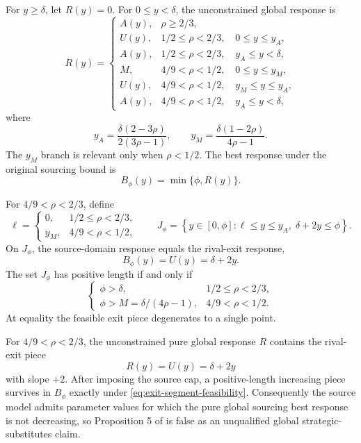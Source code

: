 For \(y\ge\delta\), let \(R(y)=0\).  For \(0\le y<\delta\), the unconstrained global response is
\begin{equation}
R(y)=
\begin{cases}
A(y),
& \rho\ge 2/3,\\[3pt]
U(y),
& 1/2\le\rho<2/3,\quad 0\le y\le y_A,\\
A(y),
& 1/2\le\rho<2/3,\quad y_A\le y<\delta,\\[3pt]
M,
& 4/9<\rho<1/2,\quad 0\le y\le y_M,\\
U(y),
& 4/9<\rho<1/2,\quad y_M\le y\le y_A,\\
A(y),
& 4/9<\rho<1/2,\quad y_A\le y<\delta,
\end{cases}
\label{eq:R}
\end{equation}
where
\begin{equation}
y_A=
\frac{\delta(2-3\rho)}{2(3\rho-1)},
\qquad
y_M=
\frac{\delta(1-2\rho)}{4\rho-1}.
\label{eq:yA-yM}
\end{equation}
The \(y_M\) branch is relevant only when \(\rho<1/2\).  The best response under the original sourcing bound is
\begin{equation}
B_\phi(y)=\min\{\phi,R(y)\}.
\label{eq:Bphi}
\end{equation}

For \(4/9<\rho<2/3\), define
\[
\ell=
\begin{cases}
0,&1/2\le\rho<2/3,\\
y_M,&4/9<\rho<1/2,
\end{cases}
\qquad
J_\phi=
\left\{
y\in[0,\phi]:
\ell\le y\le y_A,\;
\delta+2y\le\phi
\right\}.
\]
On \(J_\phi\), the source-domain response equals the rival-exit response,
\[
B_\phi(y)=U(y)=\delta+2y.
\]
The set \(J_\phi\) has positive length if and only if
\begin{equation}
\begin{cases}
\phi>\delta,&1/2\le\rho<2/3,\\[2pt]
\phi>M=\delta/(4\rho-1),&4/9<\rho<1/2.
\end{cases}
\label{eq:exit-segment-feasibility}
\end{equation}
At equality the feasible exit piece degenerates to a single point.

\begin{proposition}
\label{prop:prop5}
For \(4/9<\rho<2/3\), the unconstrained pure global response \(R\) contains the rival-exit piece
\[
R(y)=U(y)=\delta+2y
\]
with slope \(+2\).  After imposing the source cap, a positive-length increasing piece survives in \(B_\phi\) exactly under \eqref{eq:exit-segment-feasibility}.  Consequently the source model admits parameter values for which the pure global sourcing best response is not decreasing, so Proposition 5 of \cite{ShyStenbacka2005} is false as an unqualified global strategic-substitutes claim.
\end{proposition}

